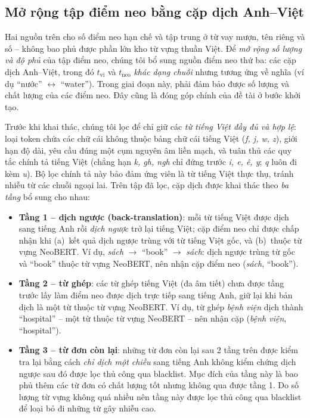 \subsection{Mở rộng tập điểm neo bằng cặp dịch Anh--Việt}
\label{subsec:anchor-mining}

Hai nguồn trên cho số điểm neo hạn chế và tập trung ở từ vay mượn, tên riêng và số -- không bao phủ
được phần lớn kho từ vựng thuần Việt. Để \textit{mở rộng số lượng và độ phủ} của tập điểm neo,
chúng tôi bổ sung nguồn điểm neo thứ ba: các cặp dịch Anh--Việt, trong đó
$t_{\mathrm{vi}}$ và $t_{\mathrm{neo}}$ \textit{khác dạng chuỗi} nhưng tương ứng về nghĩa (ví
dụ ``nước'' $\leftrightarrow$ ``water''). Trong giai đoạn này, phải đảm bảo được số lượng và chất lượng của các điểm neo.
Đây cũng là đóng góp chính của đề tài ở bước khởi tạo.

Trước khi khai thác, chúng tôi lọc để chỉ giữ các \textit{từ tiếng Việt đầy đủ và hợp lệ}: loại
token chứa các chữ cái không thuộc bảng chữ cái tiếng Việt (\textit{f, j, w, z}), giới hạn độ dài, yêu cầu đúng một cụm
nguyên âm liền mạch, và tuân thủ các quy tắc chính tả tiếng Việt (chẳng hạn \textit{k, gh,
ngh} chỉ đứng trước \textit{i, e, ê, y}; \textit{q} luôn đi kèm \textit{u}). Bộ lọc chính tả
này bảo đảm ứng viên là từ tiếng Việt thực thụ, tránh nhiễu từ các chuỗi ngoại lai. Trên tập
đã lọc, cặp dịch được khai thác theo \textit{ba tầng} bổ sung cho nhau:
\begin{itemize}
  \item \textbf{Tầng 1 -- dịch ngược (back-translation)}: mỗi từ tiếng Việt được dịch sang
        tiếng Anh rồi \textit{dịch ngược} trở lại tiếng Việt; cặp điểm neo chỉ được chấp nhận khi
        (a)~kết quả dịch ngược trùng với từ tiếng Việt gốc, và (b)~thuộc từ vựng NeoBERT. Ví dụ, \textit{sách} $\to$ ``book''
        $\to$ \textit{sách}: dịch ngược trùng từ gốc và ``book'' thuộc từ vựng NeoBERT, nên nhận
        cặp điểm neo (\textit{sách}, ``book'').
  \item \textbf{Tầng 2 -- từ ghép}: các từ ghép tiếng Việt (đa âm tiết) chưa được tầng trước
        lấy làm điểm neo được dịch trực tiếp sang tiếng Anh, giữ lại khi bản dịch là một từ thuộc từ vựng
        NeoBERT. Ví dụ, từ ghép \textit{bệnh viện} dịch thành ``hospital'' -- một từ thuộc
        từ vựng NeoBERT -- nên nhận cặp (\textit{bệnh viện}, ``hospital'').
  \item \textbf{Tầng 3 -- từ đơn còn lại}: những từ đơn còn lại sau 2 tầng trên được kiểm tra lại bằng cách \textit{chỉ dịch một chiều} sang tiếng Anh không kiểm chứng dịch
        ngược sau đó được lọc thủ công qua blacklist. Mục đích của tầng này là bao phủ thêm
        các từ đơn có chất lượng tốt nhưng không qua được tầng 1. Do số lượng từ vựng không quá nhiều nên tầng này 
        được lọc thủ công qua blacklist để loại bỏ đi những từ gây nhiễu cao.
\end{itemize}

